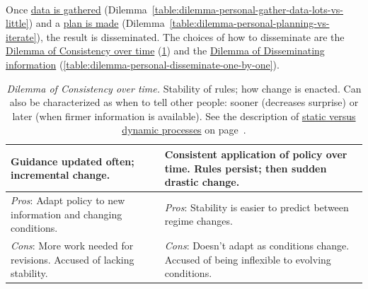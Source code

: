 

\ \\

Once \hyperref[table:dilemma-personal-gather-data-lots-vs-little]{data is gathered} (Dilemma~\ref{table:dilemma-personal-gather-data-lots-vs-little}) and a \hyperref[table:dilemma-personal-planning-vs-iterate]{plan is made} (Dilemma~\ref{table:dilemma-personal-planning-vs-iterate}), the result is disseminated. The choices of how to disseminate are the \hyperref[table:dilemma-personal-consistency-gradual-stepwise]{Dilemma of Consistency over time} (\ref{table:dilemma-personal-consistency-gradual-stepwise}) and the \hyperref[table:dilemma-personal-disseminate-one-by-one]{Dilemma of Disseminating information} (\ref{table:dilemma-personal-disseminate-one-by-one}).

\begin{center}
\begin{table}[H] %
\begin{tabular}{ | m{\dilemmatablewidth}| m{\dilemmatablewidth} | } 
  \hline
  \textbf{Guidance updated often; incremental change.} & 
  \textbf{Consistent application of policy over time. Rules persist; then sudden drastic change.} \\ 
  \hline
  \textit{Pros}: Adapt policy to new information and changing conditions. &
  \textit{Pros}: Stability is easier to predict between regime changes.  \\
  \hline
  \textit{Cons}: More work needed for revisions. Accused of lacking stability. & 
  \textit{Cons}: Doesn't adapt as conditions change. Accused of being inflexible to evolving conditions. \\
  \hline
\end{tabular}
\caption{
\textit{Dilemma of Consistency over time.} 
Stability of rules; how change is enacted. Can also be characterized as when to tell other people: sooner (decreases surprise) or later (when firmer information is available).
See the description of 
\hyperref[sec:static-dynamic-processes]{static versus dynamic processes} on page~\pageref{sec:static-dynamic-processes}.
}
\label{table:dilemma-personal-consistency-gradual-stepwise}
\end{table}
\end{center}

